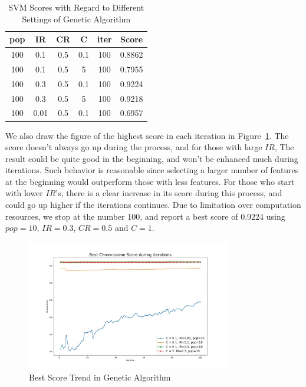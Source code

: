 \documentclass[journal]{IEEEtran}
\begin{document}
\begin{table}[htbp]
\centering
\caption{SVM Scores with Regard to Different Settings of Genetic Algorithm}
\label{tab:3}
\begin{tabular}{cccccc}
\toprule

pop&IR&CR&C&iter&Score \\  %
\midrule

100&0.1&0.5&0.1&100&0.8862 \\

100&0.1&0.5&5&100&0.7955 \\

100&0.3&0.5&0.1&100&0.9224 \\

100&0.3&0.5&5&100&0.9218 \\

100&0.01&0.5&0.1&100&0.6957 \\
\bottomrule
\end{tabular}
\end{table}
We also draw the figure of the highest score in each iteration in Figure~\ref{fig:3}. The score doesn't always go up during the process, and for those with large $IR$, The result could be quite good in the beginning, and won't be enhanced much during iterations. Such behavior is reasonable since selecting a larger number of features at the beginning would outperform those with less features. For those who start with lower $IR$'s, there is a clear increase in its score during this process, and could go up higher if the iterations continues. Due to limitation over computation resources, we stop at the number 100, and report a best score of 0.9224 using $pop=10$, $IR = 0.3$, $CR=0.5$ and $C=1$.
\begin{figure}[htpb]
  \centering
  \includegraphics[width=3.5in]{figures/selection/ga_result.jpg}
  \caption{Best Score Trend in Genetic Algorithm}
  \label{fig:3}
  \vspace{-3mm}
\end{figure}
\end{document}
